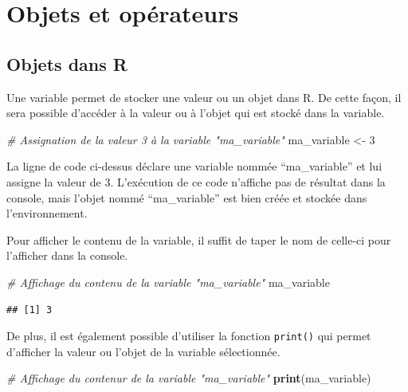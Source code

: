 \documentclass[
]{book}
\newenvironment{Shaded}{\begin{snugshade}}{\end{snugshade}}
\newcommand{\CommentTok}[1]{\textcolor[rgb]{0.56,0.35,0.01}{\textit{#1}}}
\newcommand{\DecValTok}[1]{\textcolor[rgb]{0.00,0.00,0.81}{#1}}
\newcommand{\FunctionTok}[1]{\textcolor[rgb]{0.13,0.29,0.53}{\textbf{#1}}}
\newcommand{\NormalTok}[1]{#1}
\newcommand{\OtherTok}[1]{\textcolor[rgb]{0.56,0.35,0.01}{#1}}
\begin{document}
\chapter{Objets et opérateurs}\label{objets-et-opuxe9rateurs}

\section{Objets dans R}\label{objets-dans-r}

Une variable permet de stocker une valeur ou un objet dans R. De cette façon, il sera possible d'accéder à la valeur ou à l'objet qui est stocké dans la variable.

\begin{Shaded}
\begin{Highlighting}[]
\CommentTok{\# Assignation de la valeur 3 à la variable "ma\_variable"}
\NormalTok{ma\_variable }\OtherTok{\textless{}{-}} \DecValTok{3}
\end{Highlighting}
\end{Shaded}

La ligne de code ci-dessus déclare une variable nommée ``ma\_variable'' et lui assigne la valeur de 3. L'exécution de ce code n'affiche pas de résultat dans la console, mais l'objet nommé ``ma\_variable'' est bien créée et stockée dans l'environnement.

Pour afficher le contenu de la variable, il suffit de taper le nom de celle-ci pour l'afficher dans la console.

\begin{Shaded}
\begin{Highlighting}[]
\CommentTok{\# Affichage du contenu de la variable "ma\_variable"}
\NormalTok{ma\_variable}
\end{Highlighting}
\end{Shaded}

\begin{verbatim}
## [1] 3
\end{verbatim}

De plus, il est également possible d'utiliser la fonction \texttt{print()} qui permet d'afficher la valeur ou l'objet de la variable sélectionnée.

\begin{Shaded}
\begin{Highlighting}[]
\CommentTok{\# Affichage du contenur de la variable "ma\_variable"}
\FunctionTok{print}\NormalTok{(ma\_variable)}
\end{Highlighting}
\end{Shaded}
\end{document}
